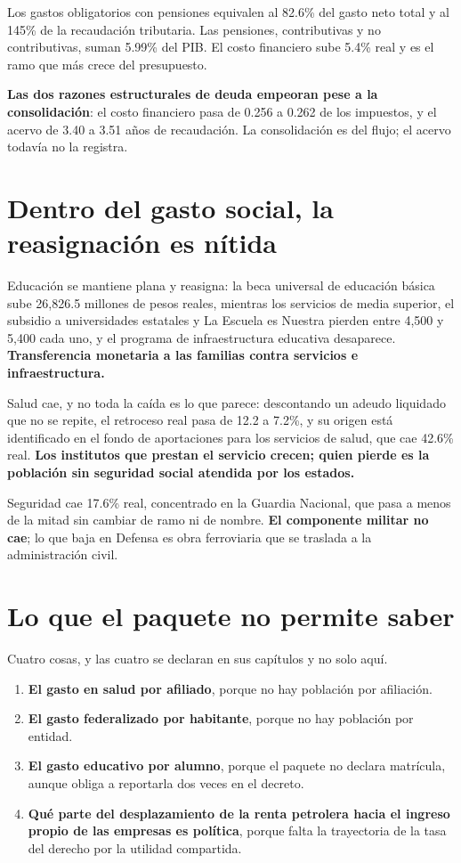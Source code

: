Los gastos obligatorios con pensiones equivalen al 82.6\% del gasto neto total y
al 145\% de la recaudación tributaria. Las pensiones, contributivas y no
contributivas, suman 5.99\% del PIB. El costo financiero sube 5.4\% real y es el
ramo que más crece del presupuesto.

\textbf{Las dos razones estructurales de deuda empeoran pese a la
consolidación}: el costo financiero pasa de 0.256 a 0.262 de los impuestos, y el
acervo de 3.40 a 3.51 años de recaudación. La consolidación es del flujo; el
acervo todavía no la registra.

\section{Dentro del gasto social, la reasignación es nítida}

Educación se mantiene plana y reasigna: la beca universal de educación básica sube
26,826.5 millones de pesos reales, mientras los servicios de media superior, el
subsidio a universidades estatales y La Escuela es Nuestra pierden entre 4,500 y
5,400 cada uno, y el programa de infraestructura educativa desaparece.
\textbf{Transferencia monetaria a las familias contra servicios e infraestructura.}

Salud cae, y no toda la caída es lo que parece: descontando un adeudo liquidado
que no se repite, el retroceso real pasa de 12.2 a 7.2\%, y su origen está
identificado en el fondo de aportaciones para los servicios de salud, que cae
42.6\% real. \textbf{Los institutos que prestan el servicio crecen; quien pierde
es la población sin seguridad social atendida por los estados.}

Seguridad cae 17.6\% real, concentrado en la Guardia Nacional, que pasa a menos de
la mitad sin cambiar de ramo ni de nombre. \textbf{El componente militar no cae};
lo que baja en Defensa es obra ferroviaria que se traslada a la administración
civil.

\section{Lo que el paquete no permite saber}

Cuatro cosas, y las cuatro se declaran en sus capítulos y no solo aquí.

\begin{enumerate}
\item \textbf{El gasto en salud por afiliado}, porque no hay población por
afiliación.
\item \textbf{El gasto federalizado por habitante}, porque no hay población por
entidad.
\item \textbf{El gasto educativo por alumno}, porque el paquete no declara
matrícula, aunque obliga a reportarla dos veces en el decreto.
\item \textbf{Qué parte del desplazamiento de la renta petrolera hacia el ingreso
propio de las empresas es política}, porque falta la trayectoria de la tasa del
derecho por la utilidad compartida.
\end{enumerate}

